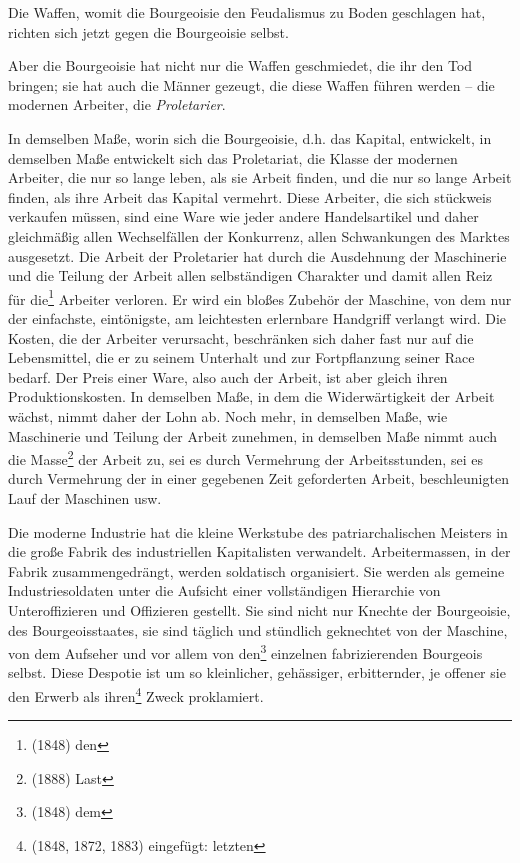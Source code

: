 \documentclass[letterpaper]{article}
\begin{document}
Die Waffen, womit die Bourgeoisie den Feudalismus zu Boden geschlagen hat, richten sich jetzt gegen die Bourgeoisie selbst.

Aber die Bourgeoisie hat nicht nur die Waffen geschmiedet, die ihr den Tod bringen; sie hat auch die Männer gezeugt, die diese Waffen führen werden – die modernen Arbeiter, die \textit{Proletarier}.

In demselben Maße, worin sich die Bourgeoisie, d.h. das Kapital, entwickelt, in demselben Maße entwickelt sich das Proletariat, die Klasse der modernen Arbeiter, die nur so lange leben, als sie Arbeit finden, und die nur so lange Arbeit finden, als ihre Arbeit das Kapital vermehrt. Diese Arbeiter, die sich stückweis verkaufen müssen, sind eine Ware wie jeder andere Handelsartikel und daher gleichmäßig allen Wechselfällen der Konkurrenz, allen Schwankungen des Marktes ausgesetzt.
Die Arbeit der Proletarier hat durch die Ausdehnung der Maschinerie und die Teilung der Arbeit allen selbständigen Charakter und damit allen Reiz für die\footnote{(1848) den} Arbeiter verloren. Er wird ein bloßes Zubehör der Maschine, von dem nur der einfachste, eintönigste, am leichtesten erlernbare Handgriff verlangt wird. Die Kosten, die der Arbeiter verursacht, beschränken sich daher fast nur auf die Lebensmittel, die er zu seinem Unterhalt und zur Fortpflanzung seiner Race bedarf. Der Preis einer Ware, also auch der Arbeit, ist aber gleich ihren Produktionskosten. In demselben Maße, in dem die Widerwärtigkeit der Arbeit wächst, nimmt daher der Lohn ab. Noch mehr, in demselben Maße, wie Maschinerie und Teilung der Arbeit zunehmen, in demselben Maße nimmt auch die Masse\footnote{(1888) Last} der Arbeit zu, sei es durch Vermehrung der Arbeitsstunden, sei es durch Vermehrung der in einer gegebenen Zeit geforderten Arbeit, beschleunigten Lauf der Maschinen usw.

Die moderne Industrie hat die kleine Werkstube des patriarchalischen Meisters in die große Fabrik des industriellen Kapitalisten verwandelt. Arbeitermassen, in der Fabrik zusammengedrängt, werden soldatisch organisiert. Sie werden als gemeine Industriesoldaten unter die Aufsicht einer vollständigen Hierarchie von Unteroffizieren und Offizieren gestellt. Sie sind nicht nur Knechte der Bourgeoisie, des Bourgeoisstaates, sie sind täglich und stündlich geknechtet von der Maschine, von dem Aufseher und vor allem von den\footnote{(1848) dem} einzelnen fabrizierenden Bourgeois selbst. Diese Despotie ist um so kleinlicher, gehässiger, erbitternder, je offener sie den Erwerb als ihren\footnote{(1848, 1872, 1883) eingefügt: letzten} Zweck proklamiert.
\end{document}
